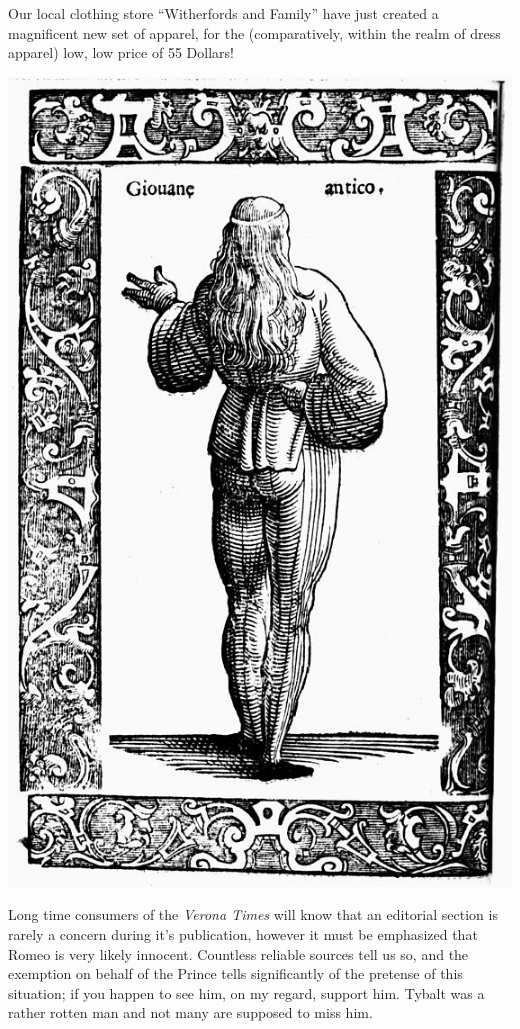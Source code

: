 \documentclass{article}
\begin{document}
{\begin{multicols}{3}
    Our local clothing store ``Witherfords and Family'' have just created a magnificent new set of apparel, for the (comparatively, within the realm of dress apparel) low, low price of 55 Dollars!
    \begin{center}
    \includegraphics{1598 Fashion.jpeg}
    \end{center}
    \closearticle
    
    \closearticle
    
    Long time consumers of the \textit{Verona Times} will know that an editorial section is rarely a concern during it's publication, however it must be emphasized that Romeo is very likely innocent.
    Countless reliable sources tell us so, and the exemption on behalf of the Prince tells significantly of the pretense of this situation; if you happen to see him, on my regard, support him.
    Tybalt was a rather rotten man and not many are supposed to miss him.
    \closearticle
\end{multicols}
}
\end{document}
